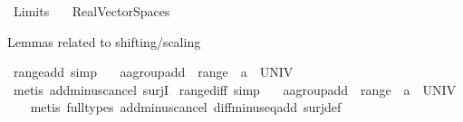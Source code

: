 %
\begin{isabellebody}%
%
%
\isadelimdocument
%
\endisadelimdocument
%
\isatagdocument
%
\isamarkuptrue%
%
\endisatagdocument
{\isafolddocument}%
%
\isadelimdocument
%
\endisadelimdocument
%
\isadelimtheory
%
\endisadelimtheory
%
\isatagtheory
{}\isamarkupfalse%
\ Limits\isanewline
\ \ \ Real{\isacharunderscore}{\kern0pt}Vector{\isacharunderscore}{\kern0pt}Spaces\isanewline
{}%
\endisatagtheory
{\isafoldtheory}%
%
\isadelimtheory
%
\endisadelimtheory
%
\begin{isamarkuptext}%
Lemmas related to shifting/scaling%
\end{isamarkuptext}\isamarkuptrue%
\isamarkupfalse%
\ range{\isacharunderscore}{\kern0pt}add\ {\isacharbrackleft}{\kern0pt}simp{\isacharbrackright}{\kern0pt}{\isacharcolon}{\kern0pt}\isanewline
\ \ \ a{\isacharcolon}{\kern0pt}{\isacharcolon}{\kern0pt}{\isachardoublequoteopen}{\isacharprime}{\kern0pt}a{\isacharcolon}{\kern0pt}{\isacharcolon}{\kern0pt}group{\isacharunderscore}{\kern0pt}add{\isachardoublequoteclose}\ \ {\isachardoublequoteopen}range\ {\isacharparenleft}{\kern0pt}{\isacharparenleft}{\kern0pt}{\isacharplus}{\kern0pt}{\isacharparenright}{\kern0pt}\ a{\isacharparenright}{\kern0pt}\ {\isacharequal}{\kern0pt}\ UNIV{\isachardoublequoteclose}\isanewline
%
\isadelimproof
\ \ %
\endisadelimproof
%
\isatagproof
{}\isamarkupfalse%
\ {\isacharparenleft}{\kern0pt}metis\ add{\isacharunderscore}{\kern0pt}minus{\isacharunderscore}{\kern0pt}cancel\ surjI{\isacharparenright}{\kern0pt}%
\endisatagproof
{\isafoldproof}%
%
\isadelimproof
\isanewline
%
\endisadelimproof
\isanewline
{}\isamarkupfalse%
\ range{\isacharunderscore}{\kern0pt}diff\ {\isacharbrackleft}{\kern0pt}simp{\isacharbrackright}{\kern0pt}{\isacharcolon}{\kern0pt}\isanewline
\ \ \ a{\isacharcolon}{\kern0pt}{\isacharcolon}{\kern0pt}{\isachardoublequoteopen}{\isacharprime}{\kern0pt}a{\isacharcolon}{\kern0pt}{\isacharcolon}{\kern0pt}group{\isacharunderscore}{\kern0pt}add{\isachardoublequoteclose}\ \ {\isachardoublequoteopen}range\ {\isacharparenleft}{\kern0pt}{\isacharparenleft}{\kern0pt}{\isacharminus}{\kern0pt}{\isacharparenright}{\kern0pt}\ a{\isacharparenright}{\kern0pt}\ {\isacharequal}{\kern0pt}\ UNIV{\isachardoublequoteclose}\isanewline
%
\isadelimproof
\ \ %
\endisadelimproof
%
\isatagproof
{}\isamarkupfalse%
\ {\isacharparenleft}{\kern0pt}metis\ {\isacharparenleft}{\kern0pt}full{\isacharunderscore}{\kern0pt}types{\isacharparenright}{\kern0pt}\ add{\isacharunderscore}{\kern0pt}minus{\isacharunderscore}{\kern0pt}cancel\ diff{\isacharunderscore}{\kern0pt}minus{\isacharunderscore}{\kern0pt}eq{\isacharunderscore}{\kern0pt}add\ surj{\isacharunderscore}{\kern0pt}def{\isacharparenright}{\kern0pt}%

\end{isabellebody}
